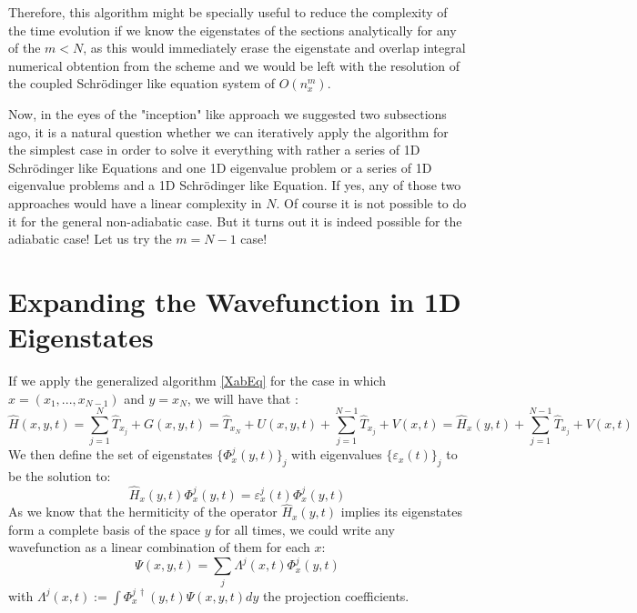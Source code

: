 \documentclass[11pt, a4paper]{article} %
\begin{document}
Therefore, this algorithm might be specially useful to reduce the complexity of the time evolution if we know the eigenstates of the sections analytically for any of the $m<N$, as this would immediately erase the eigenstate and overlap integral numerical obtention from the scheme and we would be left with the resolution of the coupled Schrödinger like equation system of $O(n_x^{m})$.

Now, in the eyes of the "inception" like approach we suggested two subsections ago, it is a natural question whether we can iteratively apply the algorithm for the simplest case in order to solve it everything with rather a series of 1D Schrödinger like Equations and one 1D eigenvalue problem or a series of 1D eigenvalue problems and a 1D Schrödinger like Equation. If yes, any of those two approaches would have a linear complexity in $N$. Of course it is not possible to do it for the general non-adiabatic case. But it turns out it is indeed possible for the adiabatic case! Let us try the $m=N-1$ case!

\section{Expanding the Wavefunction in 1D Eigenstates}
If we apply the generalized algorithm \eqref{XabEq} for the case in which $x=(x_1,...,x_{N-1})$ and $y=x_N$, we will have that :
\begin{equation}
\hat{H}(x, y, t)= \sum_{j=1}^{N}\hat{T}_{x_j}+G(x, y, t)=\hat{T}_{x_N}+U(x, y, t)+\sum_{j=1}^{N-1}\hat{T}_{x_j}+V(x,t) = \hat{H}_x(y,t)+\sum_{j=1}^{N-1}\hat{T}_{x_j}+V(x,t)
\end{equation}
We then define the set of eigenstates $\{\Phi^j_x(y,t)\}_j$ with eigenvalues $\{\varepsilon_x(t)\}_j$ to be the solution to:
\begin{equation}
\hat{H}_x(y,t)\Phi^j_x(y,t)=\varepsilon^j_x(t)\Phi^j_x(y,t)
\end{equation}
As we know that the hermiticity of the operator $\hat{H}_x(y,t)$ implies its eigenstates form a complete basis of the space $y$ for all times, we could write any wavefunction as a linear combination of them for each $x$:
\begin{equation}
\Psi(x,y,t)=\sum_j \Lambda^j(x,t) \Phi^j_x(y,t)
\end{equation}
with $\Lambda^j(x,t):= \int \Phi^{j\ \dagger}_x(y,t) \Psi(x,y,t)dy$ the projection coefficients.
\end{document}
